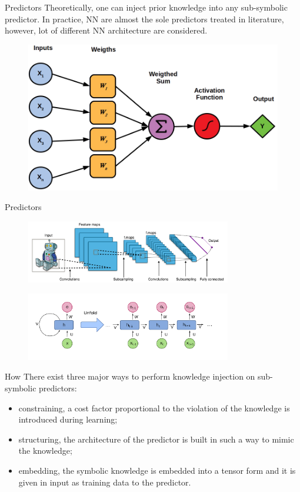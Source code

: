 \documentclass[presentation]{beamer}\mode<presentation>{\usetheme{AMSBolognaFC}}
\begin{document}
\begin{frame}[c]{Predictors}
    Theoretically, one can inject prior knowledge into any sub-symbolic predictor.
    In practice, NN are almost the sole predictors treated in literature, however, lot of different NN architecture are considered.
    \begin{figure}
        \centering
        \includegraphics[width=.6\linewidth]{figures/neuron.png}
    \end{figure}
\end{frame}

\begin{frame}[c]{Predictors}
    \begin{figure}
        \centering
        \includegraphics[width=0.8\textwidth]{figures/cnn-architecture}
    \end{figure}
    \begin{figure}
        \centering
        \includegraphics[width=0.8\textwidth]{figures/rnn-architecture}
    \end{figure}
\end{frame}


\begin{frame}[c]{How}
    There exist three major ways to perform knowledge injection on sub-symbolic predictors:
    \begin{itemize}
        \item \alert{constraining}, a cost factor proportional to the violation of the knowledge is introduced during learning;
        \item \alert{structuring}, the architecture of the predictor is built in such a way to mimic the knowledge;
        \item \alert{embedding}, the symbolic knowledge is embedded into a tensor form and it is given in input as training data to the predictor.
   \end{itemize} 
\end{frame}
\end{document}
